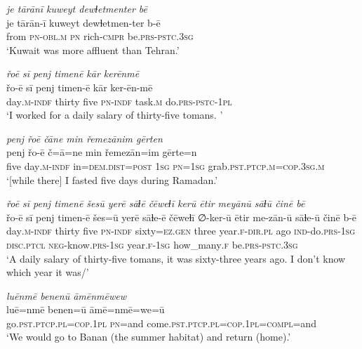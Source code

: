 \ea \label{ŽM.44}
\textit{je tārānī kuweyt dewɫetmenter bē} \\ 
\gll je tārān-ī kuweyt dewɫetmen-ter b-ē \\ 
 from \textsc{pn}\textsc{-obl}\textsc{.m} \textsc{pn} rich\textsc{-cmpr} be\textsc{.prs}\textsc{-pstc}\textsc{.3sg} \\ 
\glt `Kuwait was more affluent than Tehran.'
\z 
 
\ea \label{ŽM.46}
\textit{řoē sī penj timenē kār kerēnmē} \\ 
\gll řo-ē sī penj timen-ē kār ker-ēn-mē \\ 
 day\textsc{.m}\textsc{-indf} thirty five \textsc{pn}\textsc{-indf} task\textsc{.m} do\textsc{.prs}\textsc{-pstc}\textsc{-\textsc{1pl}} \\ 
\glt `I worked for a daily salary of thirty-five tomans. '
\z 
 
\ea \label{ŽM.47}
\textit{penj řoē čāne min řemezānim gērten} \\ 
\gll penj řo-ē č=ā=ne min řemezān=im gērte=n \\ 
 five day\textsc{.m}\textsc{-indf} in=\textsc{dem.dist}\textsc{=\textsc{post}} \textsc{1sg} \textsc{pn}\textsc{=\textsc{1sg}} grab\textsc{.pst}\textsc{.ptcp}\textsc{.m}\textsc{=cop}\textsc{.3sg}\textsc{.m} \\ 
\glt `[while there] I fasted five days during Ramadan.'
\z 
 
\ea \label{ŽM.49}
\textit{řoē sī penj timenē šesū yerē sāɫē čēweɫī kerū ētir meyānū sāɫū činē bē} \\ 
\gll řo-ē sī penj timen-ē šes=ū yerē sāɫe-ē čēweɫī ∅-ker-ū ētir me-zān-ū sāɫe-ū činē b-ē \\ 
 day\textsc{.m}\textsc{-indf} thirty five \textsc{pn}\textsc{-indf} sixty\textsc{=ez.gen} three year\textsc{.f}\textsc{-dir}\textsc{.pl} ago \textsc{ind-}do\textsc{.prs}\textsc{-\textsc{1sg}} \textsc{disc}.\textsc{ptcl} \textsc{neg-}know\textsc{.prs}\textsc{-\textsc{1sg}} year\textsc{.f}\textsc{-\textsc{1sg}} how\_many\textsc{.f} be\textsc{.prs}\textsc{-pstc}\textsc{.3sg} \\ 
\glt `A daily salary of thirty-five tomans, it was sixty-three years ago. I don’t know which year it was/'
\z 
 
\ea \label{ŽM.52}
\textit{luēnmē benenū āmēnmēwew} \\ 
\gll luē=nmē benen=ū āmē=nmē=we=ū \\ 
 go\textsc{.pst}\textsc{.ptcp}\textsc{.pl}\textsc{=cop}\textsc{.\textsc{1pl}} \textsc{pn}=and come\textsc{.pst}\textsc{.ptcp}\textsc{.pl}\textsc{=cop}\textsc{.\textsc{1pl}}\textsc{=compl}=and \\ 
\glt `We would go to Banan (the summer habitat) and return (home).'
\z 
 
